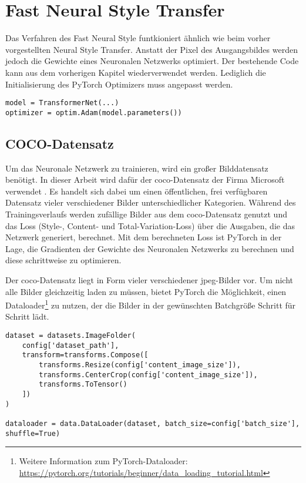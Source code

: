 \section{Fast Neural Style Transfer}

Das Verfahren des Fast Neural Style funtkioniert ähnlich wie beim vorher vorgestellten Neural Style Transfer. Anstatt der Pixel des Ausgangsbildes werden jedoch die Gewichte eines Neuronalen Netzwerks optimiert. Der bestehende Code kann aus  dem vorherigen Kapitel wiederverwendet werden. Lediglich die Initialisierung des PyTorch Optimizers muss angepasst werden.

\begin{listing}[H]
\begin{verbatim}
model = TransformerNet(...)
optimizer = optim.Adam(model.parameters())
\end{verbatim}
\end{listing}

\subsection{COCO-Datensatz}

Um das Neuronale Netzwerk zu trainieren, wird ein großer Bilddatensatz benötigt. In dieser Arbeit wird dafür der \gls{coco}-Datensatz der Firma Microsoft verwendet \cite{DBLP:journals/corr/LinMBHPRDZ14}. Es handelt sich dabei um einen öffentlichen, frei verfügbaren Datensatz vieler verschiedener Bilder unterschiedlicher Kategorien. Während des Trainingsverlaufs werden zufällige Bilder aus dem \gls{coco}-Datensatz genutzt und das Loss  (Style-, Content- und Total-Variation-Loss) über die Ausgaben, die das Netzwerk generiert, berechnet. Mit dem berechneten Loss ist PyTorch in der Lage, die Gradienten der Gewichte des Neuronalen Netzwerks zu berechnen und diese schrittweise zu optimieren.

Der \gls{coco}-Datensatz liegt in Form vieler verschiedener \gls{jpeg}-Bilder vor. Um nicht alle Bilder gleichzeitig laden zu müssen, bietet PyTorch die Möglichkeit, einen Dataloader\footnote{Weitere Information zum PyTorch-Dataloader: \url{https://pytorch.org/tutorials/beginner/data_loading_tutorial.html}} zu nutzen, der die Bilder in der gewünschten Batchgröße Schritt für Schritt lädt.

\begin{listing}[H]
\begin{verbatim}
dataset = datasets.ImageFolder(
    config['dataset_path'],
    transform=transforms.Compose([
        transforms.Resize(config['content_image_size']),
        transforms.CenterCrop(config['content_image_size']),
        transforms.ToTensor()
    ])
)

dataloader = data.DataLoader(dataset, batch_size=config['batch_size'], shuffle=True)
\end{verbatim}
\end{listing}

